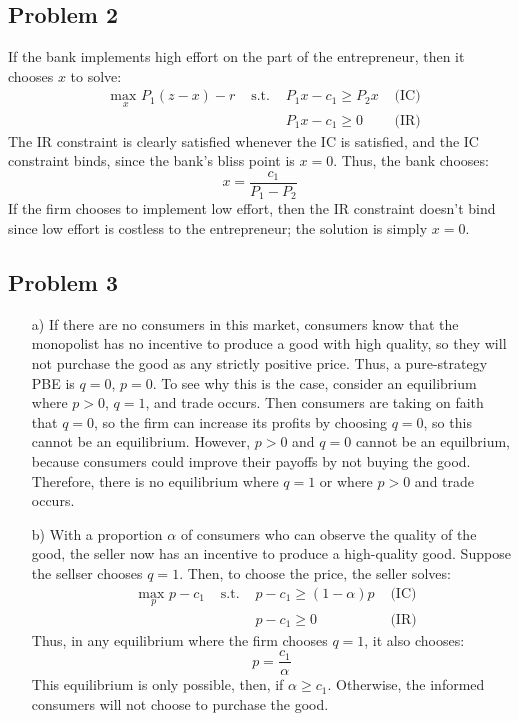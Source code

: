 \documentclass{article}
\newcommand{\usmax}[1]{\underset{#1}{\text{max }}}
\begin{document}

\subsection*{Problem 2}
If the bank implements high effort on the part of the entrepreneur, then it chooses $x$ to solve:
\begin{align*}
	&\usmax{x}P_1(z-x) - r	&\text{ s.t. }	&P_1x-c_1\geq P_2x	&\text{ (IC)}	\\
	&						&				&P_1x-c_1\geq 0		&\text{ (IR)}
\end{align*}
The IR constraint is clearly satisfied whenever the IC is satisfied, and the IC constraint binds, since the bank's bliss point is ${x=0}$. Thus, the bank chooses:
\[
	x = \frac{c_1}{P_1-P_2}
\]
If the firm chooses to implement low effort, then the IR constraint doesn't bind since low effort is costless to the entrepreneur; the solution is simply ${x=0}$. 

\pagebreak
\subsection*{Problem 3}

\begin{itemize}
	\item[a)] If there are no consumers in this market, consumers know that the monopolist has no incentive to produce a good with high quality, so they will not purchase the good as any strictly positive price. Thus, a pure-strategy PBE is ${q=0}$, ${p=0}$. To see why this is the case, consider an equilibrium where ${p>0}$, ${q=1}$, and trade occurs. Then consumers are taking on faith that ${q=0}$, so the firm can increase its profits by choosing ${q=0}$, so this cannot be an equilibrium. However, ${p>0}$ and ${q=0}$ cannot be an equilbrium, because consumers could improve their payoffs by not buying the good. Therefore, there is no equilibrium where ${q=1}$ or where ${p>0}$ and trade occurs.
	
	\item[b)] With a proportion $\alpha$ of consumers who can observe the quality of the good, the seller now has an incentive to produce a high-quality good. Suppose the sellser chooses ${q=1}$. Then, to choose the price, the seller solves:
		\begin{align*}
			&\usmax{p}p-c_1	&\text{ s.t. }	&p-c_1 \geq (1-\alpha)p	&\text{ (IC)}	\\
			&				&				&p-c_1\geq 0								&\text{ (IR)}
		\end{align*}
		Thus, in any equilibrium where the firm chooses ${q=1}$, it also chooses:
		\[
			p =\frac{c_1}{\alpha}
		\]
		This equilibrium is only possible, then, if ${\alpha\geq c_1}$. Otherwise, the informed consumers will not choose to purchase the good.
		
\end{itemize}

\end{document}
